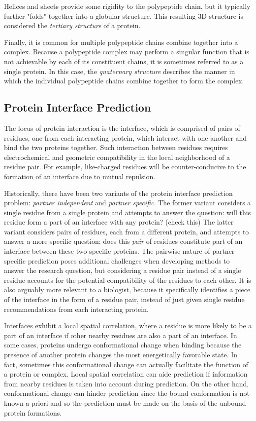 Helices and sheets provide some rigidity to the polypeptide chain, but it typically further "folds" together into a globular structure. This resulting 3D structure is considered the \textit{tertiary structure} of a protein. 

Finally, it is common for multiple polypeptide chains combine together into a complex.
Because a polypeptide complex may perform a singular function that is not achievable by each of its constituent chains, it is sometimes referred to as a single protein. 
In this case, the \textit{quaternary structure} describes the manner in which the individual polypeptide chains combine together to form the complex. 



\subsection{Protein Interface Prediction}

The locus of protein interaction is the interface, which is comprised of pairs of residues, one from each interacting protein, which interact with one another and bind the two proteins together.
Such interaction between residues requires electrochemical and geometric compatibility in the local neighborhood of a residue pair.
For example, like-charged residues will be counter-conducive to the formation of an interface due to mutual repulsion.

Historically, there have been two variants of the protein interface prediction problem: \textit{partner independent} and \textit{partner specific}.
The former variant considers a single residue from a single protein and attempts to answer the question: will this residue form a part of an interface with any protein? (check this)
The latter variant considers pairs of residues, each from a different protein, and attempts to answer a more specific question: does this \textit{pair} of residues constitute part of an interface between these two specific proteins. 
The pairwise nature of partner specific prediction poses additional challenges when developing methods to answer the research question, but considering a residue pair instead of a single residue accounts for the potential compatibility of the residues to each other.
It is also arguably more relevant to a biologist, because it specifically identifies a piece of the interface in the form of a residue pair, instead of just given single residue recommendations from each interacting protein. 

Interfaces exhibit a local spatial correlation, where a residue is more likely to be a part of an interface if other nearby residues are also a part of an interface. 
In some cases, proteins undergo conformational change when binding because the presence of another protein changes the most energetically favorable state. 
In fact, sometimes this conformational change can actually facilitate the function of a protein or complex.
Local spatial correlation can aide prediction if information from nearby residues is taken into account during prediction.
On the other hand, conformational change can hinder prediction since the bound conformation is not known a priori and so the prediction must be made on the basis of the unbound protein formations. 

